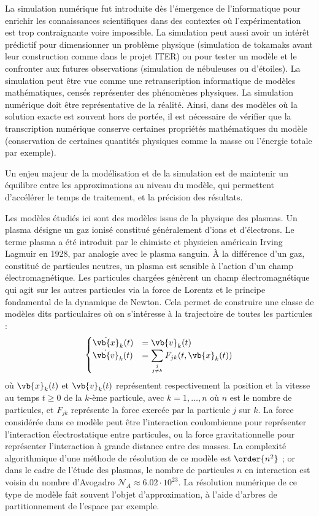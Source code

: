 
La simulation numérique fut introduite dès l’émergence de l’informatique pour enrichir les connaissances scientifiques dans des contextes où l’expérimentation est trop contraignante voire impossible. La simulation peut aussi avoir un intérêt prédictif pour dimensionner un problème physique (simulation de tokamaks avant leur construction comme dans le projet ITER) ou pour tester un modèle et le confronter aux futures observations (simulation de nébuleuses ou d’étoiles). La simulation peut être vue comme une retranscription informatique de modèles mathématiques, censés représenter des phénomènes physiques. La simulation numérique doit être représentative de la réalité. Ainsi, dans des modèles où la solution exacte est souvent hors de portée, il est nécessaire de vérifier que la transcription numérique conserve certaines propriétés mathématiques du modèle (conservation de certaines quantités physiques comme la masse ou l’énergie totale par exemple).

Un enjeu majeur de la modélisation et de la simulation est de maintenir un équilibre entre les approximations au niveau du modèle, qui permettent d’accélérer le temps de traitement, et la précision des résultats.

Les modèles étudiés ici sont des modèles issus de la physique des plasmas. Un plasma désigne un gaz ionisé constitué généralement d'ions et d'électrons. Le terme plasma a été introduit par le chimiste et physicien américain Irving Lagmuir en 1928, par analogie avec le plasma sanguin. À la différence d'un gaz, constitué de particules neutres, un plasma est sensible à l'action d'un champ électromagnétique. Les particules chargées génèrent un champ électromagnétique qui agit sur les autres particules via la force de Lorentz et le principe fondamental de la dynamique de Newton. Cela permet de construire une classe de modèles dits particulaires où on s'intéresse à la trajectoire de toutes les particules :
$$
  \begin{cases}
    \dot{\vb{x}}_k(t) &= \vb{v}_k(t) \\
    \dot{\vb{v}}_k(t) &= \displaystyle\sum_{j\atop j\neq k} F_{jk}(t,\vb{x}_k(t))
  \end{cases}
$$
où $\vb{x}_k(t)$ et $\vb{v}_k(t)$ représentent respectivement la position et la vitesse au temps $t\geq0$ de la $k$-ème particule, avec $k=1,\dots,n$ où $n$ est le nombre de particules, et $F_{jk}$ représente la force exercée par la particule $j$ sur $k$. La force considérée dans ce modèle peut être l'interaction coulombienne pour représenter l'interaction électrostatique entre particules, ou la force gravitationnelle pour représenter l'interaction à grande distance entre des masses. La complexité algorithmique d'une méthode de résolution de ce modèle est $\order{n^2}$ ; or dans le cadre de l'étude des plasmas, le nombre de particules $n$ en interaction est voisin du nombre d'Avogadro $\mathcal{N}_A\approx 6.02\cdot 10^{23}$. La résolution numérique de ce type de modèle fait souvent l'objet d'approximation, à l'aide d'arbres de partitionnement de l'espace par exemple.

